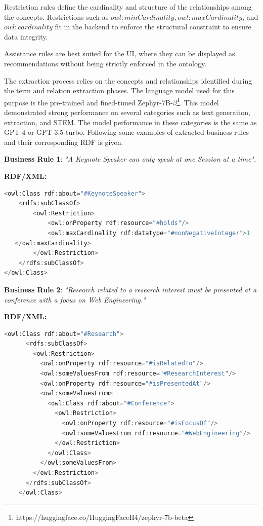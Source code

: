 Restriction rules define the cardinality and structure of the
relationships among the concepts. Restrictions such as
\(owl:minCardinality\),\(\ owl:maxCardinality\), and \(owl:cardinality\)
fit in the backend to enforce the structural constraint to ensure data
integrity.

Assistance rules are best suited for the UI, where they can be displayed
as recommendations without being strictly enforced in the ontology.

The extraction process relies on the concepts and relationships
identified during the term and relation extraction phases. The language
model used for this purpose is the pre-trained and fined-tuned
Zephyr-7B-$\beta$\footnote{https://huggingface.co/HuggingFaceH4/zephyr-7b-beta}.
This model demonstrated strong performance on several categories such as
text generation, extraction, and STEM. The model performance in these
categories is the same as GPT-4 or GPT-3.5-turbo. Following some
examples of extracted business rules and their corresponding RDF is
given.

\textbf{Business Rule 1}: \emph{"A Keynote Speaker can only speak at one
Session at a time"}.

\textbf{RDF/XML:}
\begin{lstlisting}[language=JavaScript, captionpos=t, caption=Example of a bussiness rule XML/Rdf]
<owl:Class rdf:about="#KeynoteSpeaker">
    <rdfs:subClassOf>
        <owl:Restriction>
            <owl:onProperty rdf:resource="#holds"/>
            <owl:maxCardinality rdf:datatype="#nonNegativeInteger">1 
   </owl:maxCardinality>
        </owl:Restriction>
    </rdfs:subClassOf>
</owl:Class>
\end{lstlisting}

\textbf{Business Rule 2}: \emph{"Research related to a research interest must
be presented at a conference with a focus on Web Engineering."}

\textbf{RDF/XML:}

\begin{lstlisting}[language=JavaScript, captionpos=t, caption=Example of a bussiness rule XML/Rdf]
<owl:Class rdf:about="#Research">
      <rdfs:subClassOf>
        <owl:Restriction>
          <owl:onProperty rdf:resource="#isRelatedTo"/>
          <owl:someValuesFrom rdf:resource="#ResearchInterest"/>
          <owl:onProperty rdf:resource="#isPresentedAt"/>
          <owl:someValuesFrom>
            <owl:Class rdf:about="#Conference">
              <owl:Restriction>
                <owl:onProperty rdf:resource="#isFocusOf"/>
                <owl:someValuesFrom rdf:resource="#WebEngineering"/>
              </owl:Restriction>
            </owl:Class>
          </owl:someValuesFrom>
        </owl:Restriction>
      </rdfs:subClassOf>
    </owl:Class>

\end{lstlisting}

